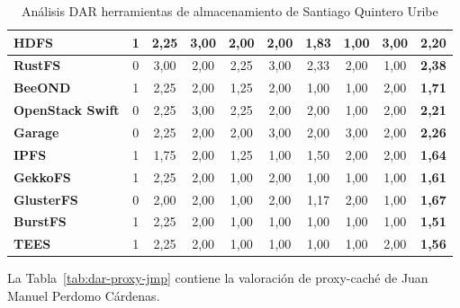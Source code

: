 \begin{table}[H]
\begin{tabular}{|>{\raggedright\arraybackslash\bfseries}p{2.7cm}|c|c|c|c|c|c|c|c|c|}
HDFS & 1 & 2,25 & 3,00 & 2,00 & 2,00 & 1,83 & 1,00 & 3,00 & \textbf{2,20} \\ \hline
\rowcolor{gridrow} RustFS & 0 & 3,00 & 2,00 & 2,25 & 3,00 & 2,33 & 2,00 & 1,00 & \textbf{2,38} \\ \hline
BeeOND & 1 & 2,25 & 2,00 & 1,25 & 2,00 & 1,00 & 1,00 & 2,00 & \textbf{1,71} \\ \hline
\rowcolor{gridrow} OpenStack Swift & 0 & 2,25 & 3,00 & 2,25 & 2,00 & 2,00 & 1,00 & 2,00 & \textbf{2,21} \\ \hline
Garage & 0 & 2,25 & 2,00 & 2,00 & 3,00 & 2,00 & 3,00 & 2,00 & \textbf{2,26} \\ \hline
\rowcolor{gridrow} IPFS & 1 & 1,75 & 2,00 & 1,25 & 1,00 & 1,50 & 2,00 & 2,00 & \textbf{1,64} \\ \hline
GekkoFS & 1 & 2,25 & 2,00 & 1,00 & 2,00 & 1,00 & 1,00 & 1,00 & \textbf{1,61} \\ \hline
\rowcolor{gridrow} GlusterFS & 0 & 2,00 & 2,00 & 1,00 & 2,00 & 1,17 & 2,00 & 1,00 & \textbf{1,67} \\ \hline
BurstFS & 1 & 2,25 & 2,00 & 1,00 & 1,00 & 1,00 & 1,00 & 1,00 & \textbf{1,51} \\ \hline
\rowcolor{gridrow} TEES & 1 & 2,25 & 2,00 & 1,00 & 1,00 & 1,00 & 1,00 & 2,00 & \textbf{1,56} \\ \hline
\end{tabular}
\caption{Análisis DAR herramientas de almacenamiento de Santiago Quintero Uribe}
\label{tab:dar-almac-squ}
\end{table}

La Tabla~\ref{tab:dar-proxy-jmp} contiene la valoración de proxy-caché de Juan Manuel Perdomo
Cárdenas.

